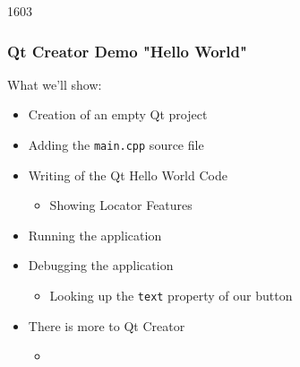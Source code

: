 \begin{slide}{1603}
  \frametitle{Qt Creator Demo "Hello World"}
  What we'll show:
  \begin{itemize}
  \item Creation of an empty Qt project
  \item Adding the \texttt{main.cpp} source file
  \item Writing of the Qt Hello World Code
    \begin{itemize}
    \item Showing Locator Features
    \end{itemize}
  \item Running the application
  \item Debugging the application
    \begin{itemize}
    \item Looking up the \texttt{text} property of our button
    \end{itemize}
  \end{itemize}
  \medskip
  \begin{itemize}
  \item There is more to Qt Creator
    \begin{itemize}
    \item[] 
    \end{itemize}
  \end{itemize}
\end{slide}
